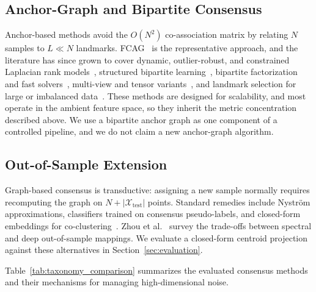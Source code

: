 \documentclass[pdflatex,sn-mathphys-num]{sn-jnl}
\theoremstyle{thmstyleone}
\theoremstyle{thmstyletwo}
\theoremstyle{thmstylethree}
\begin{document}
\subsection{Anchor-Graph and Bipartite Consensus}\label{sec:rel_anchor}

Anchor-based methods avoid the $O(N^2)$ co-association matrix by relating $N$ samples to $L \ll N$ landmarks. FCAG~\cite{nie2024fast} is the representative approach, and the literature has since grown to cover dynamic, outlier-robust, and constrained Laplacian rank models~\cite{xu2026range,ma2025large,gao2026consistency}, structured bipartite learning~\cite{zhang2025structured,wang2024structured}, bipartite factorization and fast solvers~\cite{tkde2026fast,ma2025fast,zhang2025anchor,xie2025fast}, multi-view and tensor variants~\cite{fettal2026scalable,ren2026multiview,song2026enhanced,ou2024anchor,zhao2024multiview,fan2026robust}, and landmark selection for large or imbalanced data~\cite{guo2026consensus,kong2026adaptive,li2026rfag,chakraborty2026generic}. These methods are designed for scalability, and most operate in the ambient feature space, so they inherit the metric concentration described above. We use a bipartite anchor graph as one component of a controlled pipeline, and we do not claim a new anchor-graph algorithm.

\subsection{Out-of-Sample Extension}\label{sec:rel_inductive}

Graph-based consensus is transductive: assigning a new sample normally requires recomputing the graph on $N + |\mathcal{X}_{\text{test}}|$ points. Standard remedies include Nystr\"om approximations, classifiers trained on consensus pseudo-labels, and closed-form embeddings for co-clustering~\cite{wang2026normalized}. Zhou et al.~\cite{zhou2024comprehensive} survey the trade-offs between spectral and deep out-of-sample mappings. We evaluate a closed-form centroid projection against these alternatives in Section~\ref{sec:evaluation}.

Table~\ref{tab:taxonomy_comparison} summarizes the evaluated consensus methods and their mechanisms for managing high-dimensional noise.
\end{document}
